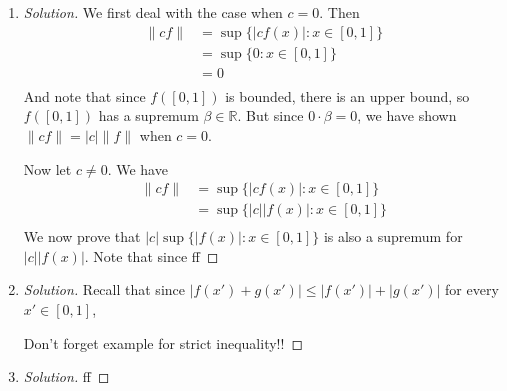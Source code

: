 \documentclass{article}
\newcommand{\R}{{\mathbb R}}
\begin{document}
\begin{enumerate}
	\item \begin{proof}[Solution]\let\qed\relax
		We first deal with the case when $c = 0$.
		Then
		\begin{align*}
			\lVert cf \rVert
			&= \sup\{|cf(x)| \colon x \in [0,1]\}\\
			&= \sup\{0 \colon x \in [0,1]\}\\
			&= 0\\
		\end{align*}
		And note that since $f([0,1])$ is bounded,
		there is an upper bound, so $f([0,1])$ has a supremum $\beta \in \R$.
		But since $0\cdot \beta = 0$,
		we have shown $\lVert cf \rVert = |c|\lVert f\rVert$ when $c=0$.

		Now let $c \neq 0$.
		We have
		\begin{align*}
			\lVert cf \rVert
			&= \sup\{|cf(x)| \colon x \in [0,1]\}\\
			&= \sup\{|c||f(x)| \colon x \in [0,1]\}\\
		\end{align*}
		We now prove that $|c|\sup\{|f(x)| \colon x \in [0,1]\}$
		is also a supremum for $|c||f(x)|$.
		Note that since ff
	\end{proof}
	\item \begin{proof}[Solution]\let\qed\relax
		Recall that since $|f(x') + g(x')| \leq |f(x')| + |g(x')|$
		for every $x' \in [0,1]$,

		Don't forget example for strict inequality!!
	\end{proof}
	\item \begin{proof}[Solution]\let\qed\relax
		ff
	\end{proof} 
\end{enumerate}
\end{document}
